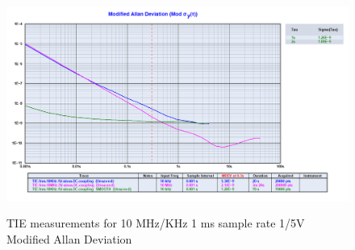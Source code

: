 \documentclass[11pt,english,a4paper]{article}
\begin{document}
\begin{figure}[!htb]
  \centering
    \includegraphics[width=1\textwidth]{mod_allan_last_part3.png}
    \label{fig:15Vsg_10x_mod_allan_dev}
      \caption{TIE measurements for 10 MHz/KHz 1 ms sample rate 1/5V Modified Allan Deviation}
\end{figure}
\end{document}
